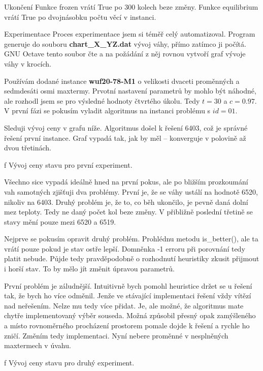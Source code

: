 \secc Ukončení
Funkce frozen vrátí True po 300 kolech beze změny. Funkce equilibrium vrátí True po dvojnásobku počtu věcí v instanci.


\vfill\break
\sec Experimentace
Proces experimentace jsem si téměř celý automatizoval. Program generuje do souboru {\bf chart\_X\_YZ.dat} vývoj váhy, přímo zatímco ji počítá. GNU Octave tento soubor čte a na požádání z něj rovnou vytvoří graf vývoje váhy v krocích.

Používám dodané instance {\bf wuf20-78-M1} o velikosti dvaceti proměnných a sedmdesáti osmi maxtermy. Prvotní nastavení parametrů by mohlo být náhodné, ale rozhodl jsem se pro výsledné hodnoty čtvrtého úkolu. Tedy  $t = 30$ a $c = 0.97$. V první fázi se pokusím vyladit algoritmus na instanci problému s $id=01$.

Sleduji vývoj ceny v grafu níže. Algoritmus došel k řešení 6403, což je správné řešení první instance. Graf vypadá tak, jak by měl -- konverguje v polovině až dvou třetinách.



\centerline{ \picwidth=17cm  }
\caption/f Vývoj ceny stavu pro první experiment.
\bigskip

Všechno sice vypadá ideálně hned na první pokus, ale po bližším prozkoumání vah samotných zjišťuji dva problémy. První je, že se váhy ustálí na hodnotě 6520, nikoliv na 6403. Druhý problém je, že to, co běh ukončilo, je pevně daná dolní mez teploty. Tedy ne daný počet kol beze změny. V přibližně poslední třetině se stavy mění pouze mezi 6520 a 6519.

Nejprve se pokusím opravit druhý problém. Prohlédnu metodu is\_better(), ale ta vrátí  pouze pokud je stav ostře lepší. Domněnka -1 erroru při porovnání tedy platit nebude. Půjde tedy pravděpodobně o rozhodnutí heuristiky zkusit přijmout i horší stav. To by mělo jít změnit úpravou parametrů.

První problém je záludnější. Intuitivně bych pomohl heuristice držet se u řešení tak, že bych ho více odměnil. Jenže ve stávající implementaci řešení vždy vítězí nad neřešením. Nelze mu tedy více přidat. Je, ale možné, že algoritmus mate chytře implementovaný výběr souseda. Možná způsobil přesný opak zamýšleného a místo rovnoměrného procházení prostorem pomale dojde k řešení a rychle ho zničí. Změním tedy implementaci. Nyní nebere proměnné v nesplněných maxtermech v úvahu.

\centerline{ \picwidth=15cm  }
\caption/f Vývoj ceny stavu pro druhý experiment.
\bigskip

